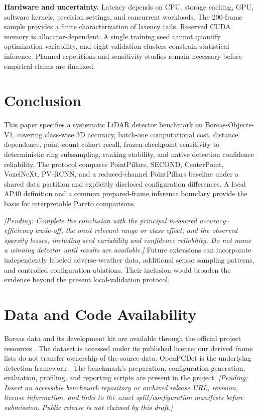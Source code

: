 \documentclass[10pt,twocolumn]{article}
\newcommand{\pending}[1]{\textcolor{blue!55!black}{\textit{[Pending: #1]}}}
\begin{document}
\textbf{Hardware and uncertainty.} Latency depends on CPU, storage caching, GPU, software kernels, precision settings, and concurrent workloads. The 200-frame sample provides a finite characterization of latency tails. Reserved CUDA memory is allocator-dependent. A single training seed cannot quantify optimization variability, and eight validation clusters constrain statistical inference. Planned repetitions and sensitivity studies remain necessary before empirical claims are finalized.

\section{Conclusion}
This paper specifies a systematic LiDAR detector benchmark on Boreas-Objects-V1, covering class-wise 3D accuracy, batch-one computational cost, distance dependence, point-count cohort recall, frozen-checkpoint sensitivity to deterministic ring subsampling, ranking stability, and native detection confidence reliability. The protocol compares PointPillars, SECOND, CenterPoint, VoxelNeXt, PV-RCNN, and a reduced-channel PointPillars baseline under a shared data partition and explicitly disclosed configuration differences. A local AP40 definition and a common prepared-frame inference boundary provide the basis for interpretable Pareto comparisons.

\pending{Complete the conclusion with the principal measured accuracy--efficiency trade-off, the most relevant range or class effect, and the observed sparsity losses, including seed variability and confidence reliability. Do not name a winning detector until results are available.} Future extensions can incorporate independently labeled adverse-weather data, additional sensor sampling patterns, and controlled configuration ablations. Their inclusion would broaden the evidence beyond the present local-validation protocol.

\section*{Data and Code Availability}
Boreas data and its development kit are available through the official project resources \cite{boreas_site,boreas_aws,pyboreas}. The dataset is accessed under its published license; our derived frame lists do not transfer ownership of the source data. OpenPCDet is the underlying detection framework \cite{openpcdet2020}. The benchmark's preparation, configuration generation, evaluation, profiling, and reporting scripts are present in the project. \pending{Insert an accessible benchmark repository or archived release URL, revision, license information, and links to the exact split/configuration manifests before submission. Public release is not claimed by this draft.}
\end{document}
